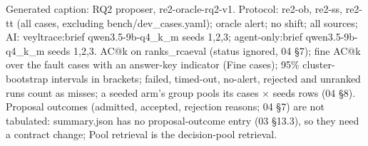 \noindent Generated caption: RQ2 proposer, re2-oracle-rq2-v1. Protocol: re2-ob, re2-ss, re2-tt (all cases, excluding bench/\allowbreak{}dev\_cases.yaml); oracle alert; no shift; all sources; AI: veyltrace:brief qwen3.5-9b-q4\_k\_m seeds 1,2,3; agent-only:brief qwen3.5-9b-q4\_k\_m seeds 1,2,3. AC@k on ranks\_rcaeval (status ignored, 04 \S{}7); fine AC@k over the fault cases with an answer-key indicator (Fine cases); 95\% cluster-bootstrap intervals in brackets; failed, timed-out, no-alert, rejected and unranked runs count as misses; a seeded arm's group pools its cases $\times$ seeds rows (04 \S{}8). Proposal outcomes (admitted, accepted, rejection reasons; 04 \S{}7) are not tabulated: summary.json has no proposal-outcome entry (03 \S{}13.3), so they need a contract change; Pool retrieval is the decision-pool retrieval.\par
\endgroup
